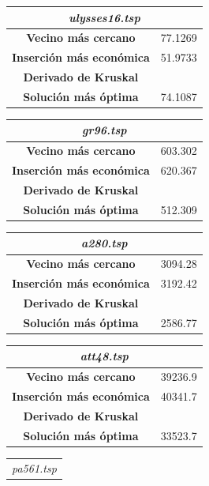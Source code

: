 \documentclass[12pt,spanish]{article}
\begin{document}
\begin{figure}[H]
\centering
\begin{tabular}{|c|c|}
\hline
\multicolumn{2}{|c|}{\textit{ulysses16.tsp}}\\
\hline
\textbf{Vecino más cercano} & 77.1269\\
\textbf{Inserción más económica} & 51.9733\\
\textbf{Derivado de Kruskal} & \\
\textbf{Solución más óptima} & 74.1087\\
\hline
\end{tabular}
\vspace{0.5cm}
\quad
\begin{tabular}{|c|c|}
\hline	
\multicolumn{2}{|c|}{\textit{gr96.tsp}}\\
\hline
\textbf{Vecino más cercano} & 603.302\\
\textbf{Inserción más económica} & 620.367\\
\textbf{Derivado de Kruskal} & \\
\textbf{Solución más óptima} & 512.309\\
\hline	
\end{tabular}
\vspace{0.5cm}
\quad
\begin{tabular}{|c|c|}
\hline	
\multicolumn{2}{|c|}{\textit{a280.tsp}}\\
\hline
\textbf{Vecino más cercano} & 3094.28\\
\textbf{Inserción más económica} & 3192.42\\
\textbf{Derivado de Kruskal} & \\
\textbf{Solución más óptima} & 2586.77\\
\hline	
\end{tabular}
\vspace{0.5cm}
\quad
\begin{tabular}{|c|c|}
\hline	
\multicolumn{2}{|c|}{\textit{att48.tsp}}\\
\hline
\textbf{Vecino más cercano} & 39236.9\\
\textbf{Inserción más económica} & 40341.7\\
\textbf{Derivado de Kruskal} & \\
\textbf{Solución más óptima} & 33523.7\\
\hline	
\end{tabular}
\vspace{0.5cm}
\quad
\begin{tabular}{|c|c|}
\hline	
\multicolumn{2}{|c|}{\textit{pa561.tsp}}\\

\end{tabular}
\end{figure}
\end{document}
